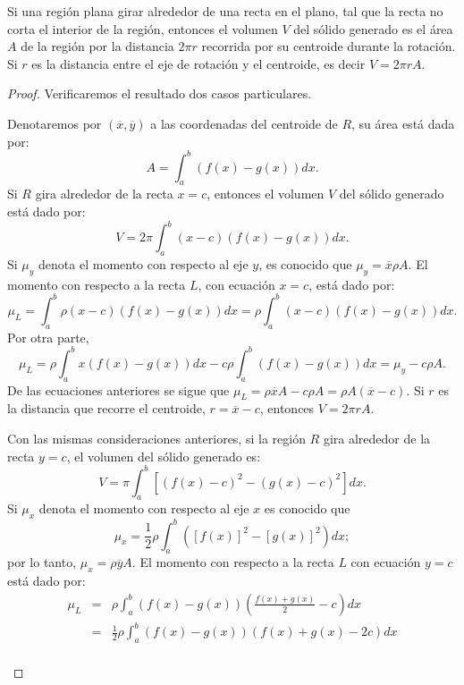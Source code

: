 \begin{teorema} 
  Si una región plana girar alrededor de una recta en el plano, tal que la recta no corta el interior de la región, entonces el volumen $V$ del sólido generado es el área $A$ de la región por la distancia
  $2\pi r$ recorrida por su centroide durante la rotación. Si $r$ es la distancia entre el eje de rotación y
  el centroide, es decir $V=2\pi rA$.
\end{teorema}
\begin{proof}
  Verificaremos el resultado dos casos particulares.
  \begin{parrafoitemize}
  \item Denotaremos por $(\overline{x},\overline{y})$ a las coordenadas del centroide de $R$,
    su área está dada por: \[A=\int_{a}^{b}\left(f(x)-g(x) \right) dx.\]
    Si $R$ gira alrededor de la recta $x=c$, entonces el volumen $V$ del sólido generado está dado por:
    \[V=2\pi \int_{a}^{b}(x-c) \left( f(x) -g(x) \right) dx.\]
    Si $\mu_y$ denota el momento con respecto al eje $y$, es conocido que $\mu_y= \overline{x}\rho A$.
    El momento con respecto a la recta $L$, con ecuación $x=c$, está dado por:
    \[\mu _{L}=\int_{a}^{b}\rho (x-c) \left( f(x)-g(x) \right) dx=\rho \int_{a}^{b}(x-c) \left(f(x) -g(x) \right) dx.\]
    Por otra parte,
    \[\mu_{L}=\rho\int_{a}^{b}x\left(f(x)-g(x)\right)dx-c\rho\int_{a}^{b}\left(f(x)-g(x)\right)dx=\mu_y-c\rho A.\]
    De las ecuaciones anteriores se sigue que $\mu_{L}=\rho \overline{x} A-c\rho A= \rho A (\overline{x}-c)$.
    Si $r$ es la distancia que recorre el centroide, $r=\overline{x}-c$, entonces $V= 2 \pi r A$.
  \item Con las mismas consideraciones anteriores, si la región $R$ gira alrededor de la recta $y=c$,
    el volumen del sólido generado es:
    \[V=\pi \int_{a}^{b}\left[ \left( f(x) -c\right) ^{2}-\left(g(x) -c\right) ^{2}\right] dx.\]
    Si $\mu_x$ denota el momento con respecto al eje $x$ es conocido que
    \[\mu_x= \frac{1}{2}\rho \int_{a}^{b}\left( [f(x)]^2 -[g(x)]^2\right)dx;\]
    por lo tanto, $\mu_x= \rho\overline{y} A$. El momento con respecto a la recta $L$ con ecuación $y=c$ está dado por:
    \begin{eqnarray*}
      \mu _{L}&=&\rho \int_{a}^{b}\left( f(x) -g(x) \right)\left( \frac{f(x) +g(x) }{2}-c\right) dx \\
      & =& \frac{1}{2}\rho \int_{a}^{b}\left( f(x) -g(x)\right) \left( f(x) +g(x) -2c\right) dx \\

\end{eqnarray*}
\end{parrafoitemize}
\end{proof}
